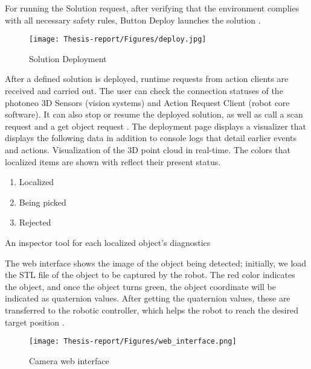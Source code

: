 \documentclass[12pt]{article}
\begin{document}
For running the Solution request, after verifying that the environment complies with all necessary safety rules, Button Deploy launches the solution \cite{ref2}.\\

\begin{figure}[h]
    \centering
    \texttt{[image: Thesis-report/Figures/deploy.jpg]}
    \caption{Solution Deployment\cite{ref2}} 
    \label{fig:solution-deployment}
\end{figure}
    
After a defined solution is deployed, runtime requests from action clients are received and carried out.  The user can check the connection statuses of the photoneo 3D Sensors (vision systems) and Action Request Client (robot core software).  It can also stop or resume the deployed solution, as well as call a scan request and a get object request \cite{ref2}.
The deployment page displays a visualizer that displays the following data in addition to console logs that detail earlier events and actions. Visualization of the 3D point cloud in real-time.  The colors that localized items are shown with reflect their present status\cite{ref2}.

\begin{enumerate}
    \item Localized \colorbox{green}\\ 
    \item Being picked \colorbox{blue}\\
    \item Rejected \colorbox{red}\\
\end{enumerate}

An inspector tool for each localized object's diagnostics\cite{ref2}

The web interface shows the image of the object being detected; initially, we load the STL file of the object to be captured by the robot. The red color indicates the object, and once the object turns green, the object coordinate will be indicated as quaternion values. After getting the quaternion values, these are transferred to the robotic controller, which helps the robot to reach the desired target position \cite{ref2}.

\begin{figure}[h]
    \centering
    \texttt{[image: Thesis-report/Figures/web\_interface.png]} 
    \caption{Camera web interface}
    \label{fig:web-interface}
\end{figure}
\end{document}
